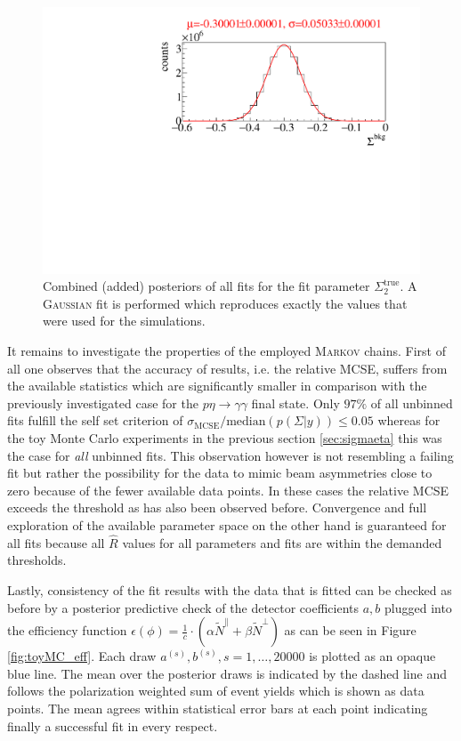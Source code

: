 \begin{figure}[htbp]
	\centering
	\includegraphics[width=.6\linewidth]{../bayes/etap_event_based_fit/plots/combined2pi0_post_add_raw.pdf}
	\caption{Combined (added) posteriors of all fits for the fit parameter $\Sigma_2^\text{true}$. A \textsc{Gaussian} fit is performed which reproduces exactly the values that were used for the simulations.}
	\label{fig:toyMCpostalt}
\end{figure}

\noindent It remains to investigate the properties of the employed \textsc{Markov} chains. First of all one observes that the accuracy of results, i.e. the relative MCSE, suffers from the available statistics which are significantly smaller in comparison with the previously investigated case for the $p\eta\to\gamma\gamma$ final state. Only $97\%$ of all unbinned fits fulfill the self set criterion of $\sigma_\text{MCSE}/\text{median}\left(p\left(\Sigma|y\right)\right)\leq0.05$ whereas for the toy Monte Carlo experiments in the previous section \ref{sec:sigmaeta} this was the case for \emph{all} unbinned fits. This observation however is not resembling a failing fit but rather the possibility for the data to mimic beam asymmetries close to zero because of the fewer available data points. In these cases the relative MCSE exceeds the threshold as has also been observed before. Convergence and full exploration of the available parameter space on the other hand is guaranteed for all fits because all $\widehat{R}$ values for all parameters and fits are within the demanded thresholds.


 Lastly, consistency of the fit results with the data that is fitted can be checked as before by a posterior predictive check of the detector coefficients $a,b$ plugged into the efficiency function $\epsilon\left(\phi\right)=\frac{1}{c}\cdot\left(\alpha \tilde{N}^\parallel + \beta\tilde{N}^\bot\right)$ as can be seen in Figure \ref{fig:toyMC_eff}. Each draw $a^{(s)},b^{(s)},s=1,\dots,20000$ is plotted as an opaque blue line. The mean over the posterior draws is indicated by the dashed line and follows the polarization weighted sum of event yields which is shown as data points. The mean agrees within statistical error bars at each point indicating finally a successful fit in every respect. 
 
